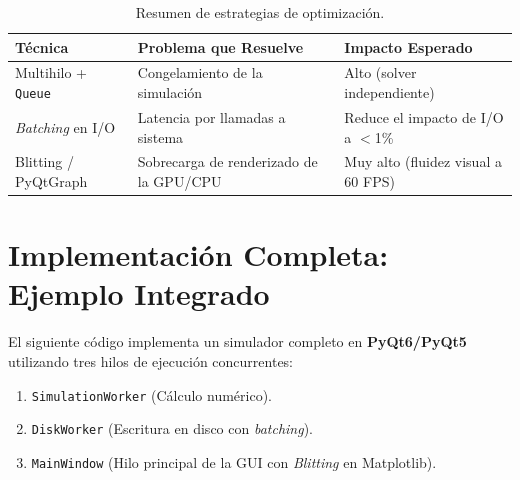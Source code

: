 \documentclass[11pt,a4paper]{article}
\begin{document}
\begin{table}[h]
\centering
\caption{Resumen de estrategias de optimización.}
\begin{tabular}{lll}
\toprule
\textbf{Técnica} & \textbf{Problema que Resuelve} & \textbf{Impacto Esperado} \\
\midrule
Multihilo + \texttt{Queue} & Congelamiento de la simulación & Alto (solver independiente) \\
\textit{Batching} en I/O & Latencia por llamadas a sistema & Reduce el impacto de I/O a $<$1\% \\
Blitting / PyQtGraph & Sobrecarga de renderizado de la GPU/CPU & Muy alto (fluidez visual a 60 FPS) \\
\bottomrule
\end{tabular}
\end{table}

\newpage
\section{Implementación Completa: Ejemplo Integrado}
El siguiente código implementa un simulador completo en \textbf{PyQt6/PyQt5} utilizando tres hilos de ejecución concurrentes:
\begin{enumerate}
    \item \texttt{SimulationWorker} (Cálculo numérico).
    \item \texttt{DiskWorker} (Escritura en disco con \textit{batching}).
    \item \texttt{MainWindow} (Hilo principal de la GUI con \textit{Blitting} en Matplotlib).
\end{enumerate}
\end{document}
